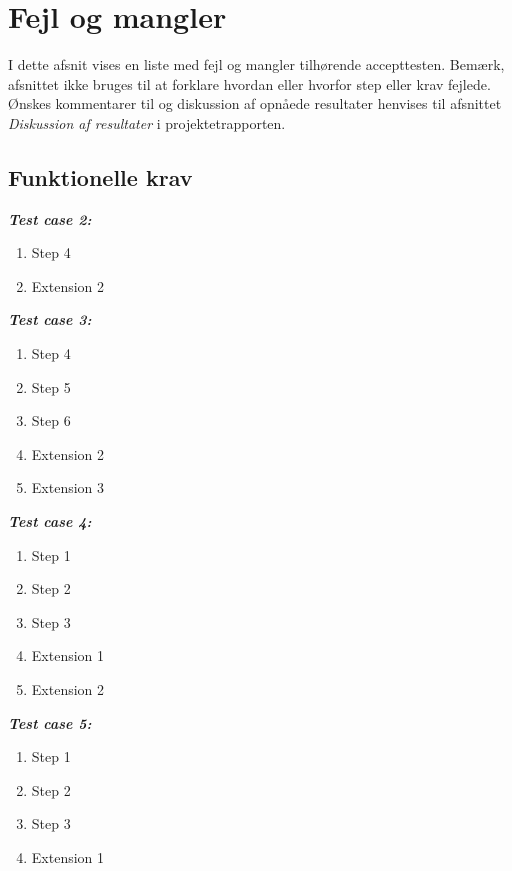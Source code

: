 \chapter{Fejl og mangler}

I dette afsnit vises en liste med fejl og mangler tilhørende accepttesten.  Bemærk, afsnittet ikke bruges til at forklare hvordan eller hvorfor step eller krav fejlede. Ønskes kommentarer til og diskussion af opnåede resultater henvises til afsnittet \textit{Diskussion af resultater} i projektetrapporten. 

\section{Funktionelle krav}

\textbf{\textit{Test case 2:} }
\begin{enumerate}
\item Step 4
\item Extension 2\\
\end{enumerate}

\textbf{\textit{Test case 3:} }
\begin{enumerate}
\item Step 4
\item Step 5
\item Step 6
\item Extension 2
\item Extension 3\\
\end{enumerate}

\textbf{\textit{Test case 4:} }
\begin{enumerate}
\item Step 1
\item Step 2
\item Step 3
\item Extension 1
\item Extension 2\\
\end{enumerate}

\textbf{\textit{Test case 5:} }
\begin{enumerate}
\item Step 1
\item Step 2
\item Step 3
\item Extension 1\\
\end{enumerate}	

